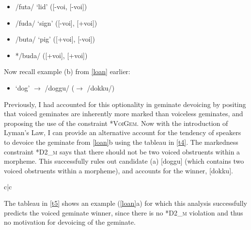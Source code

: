\documentclass{article}
\begin{document}
\begin{exe}
    \ex
    \label{*dvdv}
    \begin{itemize}
        \item [a] /futa/ ‘lid' ([-voi, [-voi])
        \item [b] /fuda/ ‘sign' ([-voi], [+voi])
        \item [c] /buta/ ‘pig' ([+voi], [-voi])
        \item [d] */buda/ ([+voi], [+voi])
    \end{itemize}
\end{exe}

Now recall example (b) from \ref{loan} earlier:

\begin{exe}
\begin{itemize}
    \item [(\ref{loan}) b] ‘dog' $\rightarrow$ /doggu/ ($\rightarrow$ /dokku/)
\end{itemize}
\end{exe}

Previously, I had accounted for this optionality in geminate devoicing by positing that voiced geminates are inherently more marked than voiceless geminates, and proposing the use of the constraint \textsc{*VoiGem}. Now with the introduction of Lyman's Law, I can provide an alternative account for the tendency of speakers to devoice the geminate from \ref{loan}b using the tableau in \ref{t4}. The markedness constraint \textsc{*D2_{m}} \citep[p. 37]{Ito&Mester2003} says that there should not be two voiced obstruents within a morpheme. This successfully rules out candidate (a) [doggu] (which contains two voiced obstruents within a morpheme), and accounts for the winner, [dokku].

\vspace{.25cm}

\begin{exe}
\ex
\label{t4}
\begin{tableau}{c|c}
  
             \vio{*!}   \vio{}            
    \vio{}    \vio{*}          
\end{tableau}
\end{exe}

\vspace{.25cm}

The tableau in \ref{t5} shows an example (\ref{loan}a) for which this analysis successfully predicts the voiced geminate winner, since there is no \textsc{*D2_{m}} violation and thus no motivation for devoicing of the geminate.
\end{document}
